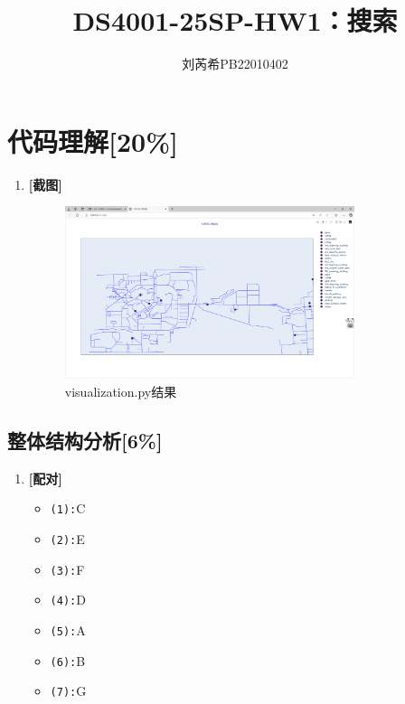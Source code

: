 \documentclass{article}
\title{\bfseries DS4001-25SP-HW1：搜索}
\author{刘芮希\quad PB22010402}
\begin{document}
\maketitle

\setcounter{section}{-1}
\section{代码理解[20\%]}

\begin{enumerate}[label=(\alph*)]
    \item \textbf{[截图]} %
    \begin{figure}[h]
    	\centering
    	\includegraphics[width=0.8\textwidth]{visualization_result.png}
    	\caption{visualization.py结果}
    \end{figure}
\end{enumerate}


\subsection{整体结构分析[6\%]}

\begin{enumerate}[label=(\alph*), start=2]
    \item \textbf{[配对]} %
    \begin{itemize}
        \item \texttt{(1):}C
        \item \texttt{(2):}E
        \item \texttt{(3):}F
        \item \texttt{(4):}D
        \item \texttt{(5):}A
        \item \texttt{(6):}B
        \item \texttt{(7):}G
    \end{itemize}
\end{enumerate}
\end{document}
